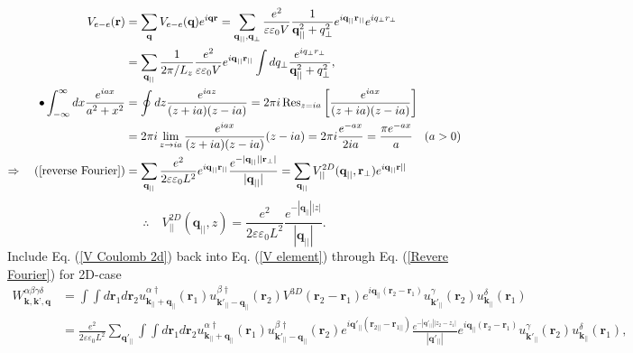 \documentclass[12pt,english,a4paper]{article}
\newcommand{\dg}{\dagger}
\begin{document}
\begin{appendices}
\begin{align}
	\label{reverse Fourier}
	V_{e-e} (\textbf{r}) &= \sum_{\textbf{q}}V_{e-e}(\textbf{q}) e^{i\textbf{q}\textbf{r}} = \sum_{\textbf{q}_{||},\textbf{q}_{\perp}} \frac{e^2}{\varepsilon \varepsilon_0 V} \frac{1}{\textbf{q}_{||}^2 +q_{\perp}^2} e^{i\textbf{q}_{||}\textbf{r}_{||}} e^{iq_{\perp} r_{\perp}} \nonumber \\
	&= \sum_{\textbf{q}_{||}}\frac{1}{2\pi/L_z}\frac{e^2}{\varepsilon \varepsilon_0 V} e^{i\textbf{q}_{||} \textbf{r}_{||}} \int dq_{\perp}\frac{e^{iq_{\perp}r_{\perp}}}{\textbf{q}_{||}^2 +q_{\perp}^2}, \\ \bullet
	\int_{-\infty}^{\infty} dx \frac{e^{iax}}{a^2 +x^2} &= \oint dz \frac{e^{iaz}}{(z+ia)(z - ia)} = 2\pi i\Res_{z=ia}\bigg[\frac{e^{iax}}{(z+ia)(z - ia)}\bigg] \nonumber\\
	&= 2\pi i \lim_{z \to ia}\frac{e^{iax}}{(z+ia)(z - ia)} (z-ia) = 2\pi i \frac{e^{-ax}}{2ia} = \frac{\pi e^{-ax}}{a} \quad (a > 0)\\ \label{Revere Fourier}
	 \Rightarrow \quad 
	(\ref{reverse Fourier}) &= \sum_{\textbf{q}_{||}} \frac{e^2}{2 \varepsilon \varepsilon_0 L^2 }e^{i\textbf{q}_{||} \textbf{r}_{||}} \frac{e^{-|\textbf{q}_{||}||\textbf{r}_{\perp}|}}{|\textbf{q}_{||}|} = \sum_{\textbf{q}_{||}}V^{2D}_{||}(\textbf{q}_{||}, \textbf{r}_\perp) e^{i\textbf{q}_{||}\textbf{r}{||}}
\end{align}
\begin{equation}
	\label{V Coulomb 2d}
	\therefore \quad V^{2D}_{||}(\textbf{q}_{||}, z) = \frac{e^2}{2 \varepsilon \varepsilon_0 L^2 }\frac{e^{- |\textbf{q}_{||}| |z|}}{|\textbf{q}_{||}|}.
\end{equation}
\quad Include Eq. (\ref{V Coulomb 2d}) back into Eq. (\ref{V element}) through Eq. (\ref{Revere Fourier}) for 2D-case
\begin{align}
	W^{\alpha\beta\gamma \delta}_{\textbf{k},\textbf{k'},\textbf{q}}&= \int \int d\textbf{r}_1 d\textbf{r}_2 u_{\textbf{k}_{||}+\textbf{q}_{||}}^{\alpha\dg}(\textbf{r}_1) u ^{\beta \dg}_{\textbf{k}'_{||}-\textbf{q}_{||}}(\textbf{r}_2) V^{3D}(\textbf{r}_2 - \textbf{r}_1) e^{i\textbf{q}_{||}(\textbf{r}_2 - \textbf{r}_1)} u^\gamma_{\textbf{k}'_{||}}(\textbf{r}_2) u^{\delta}_{\textbf{k}_{||}}(\textbf{r}_1)\\
	&=\frac{e^2}{2 \varepsilon \varepsilon_0 L^2}\sum_{\textbf{q}'_{||}}\int \int d\textbf{r}_1 d\textbf{r}_2 u_{\textbf{k}_{||}+\textbf{q}_{||}}^{\alpha\dg}(\textbf{r}_1) u ^{\beta \dg}_{\textbf{k}'_{||}-\textbf{q}_{||}}(\textbf{r}_2)e^{i\textbf{q}'_{||} (\textbf{r}_{2||} - \textbf{r}_{1||})}\frac{e^{-|\textbf{q}'_{||}||z_2-z_1|}}{|\textbf{q}'_{||}|} e^{i\textbf{q}_{||}(\textbf{r}_2 - \textbf{r}_1)} u^\gamma_{\textbf{k}'_{||}}(\textbf{r}_2) u^{\delta}_{\textbf{k}_{||}}(\textbf{r}_1)\nonumber,

\end{align}
\end{appendices}
\end{document}
